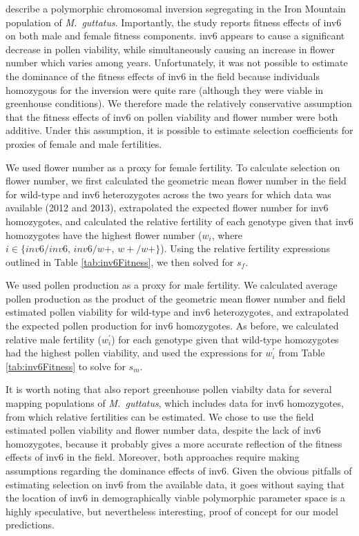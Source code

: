 \documentclass[11pt]{article}
\begin{document}
\citet{LeeKelly2015} describe a polymorphic chromosomal inversion segregating in the Iron Mountain population of {\itshape M.~guttatus}. Importantly, the study reports fitness effects of inv6 on both male and female fitness components. inv6 appears to cause a significant decrease in pollen viability, while simultaneously causing an increase in flower number which varies among years. Unfortunately, it was not possible to estimate the dominance of the fitness effects of inv6 in the field because individuals homozygous for the inversion were quite rare (although they were viable in greenhouse conditions). We therefore made the relatively conservative assumption that the fitness effects of inv6 on pollen viability and flower number were both additive. Under this assumption, it is possible to estimate selection coefficients for proxies of female and male fertilities. 

We used flower number as a proxy for female fertility. To calculate selection on flower number, we first calculated the geometric mean flower number in the field for wild-type and inv6 heterozygotes across the two years for which data was available (2012 and 2013), extrapolated the expected flower number for inv6 homozygotes, and calculated the relative fertility of each genotype given that inv6 homozygotes have the highest flower number ($w_i$, where $i \in \{inv6/inv6,\, inv6/w+,\, w+/w+\}$). Using the relative fertility expressions outlined in Table \ref{tab:inv6Fitness}, we then solved for $s_f$. 

We used pollen production as a proxy for male fertility. We calculated average pollen production as the product of the geometric mean flower number and field estimated pollen viability for wild-type and inv6 heterozygotes, and extrapolated the expected pollen production for inv6 homozygotes. As before, we calculated relative male fertility ($w^{\prime}_i$) for each genotype given that wild-type homozygotes had the highest pollen viability, and used the expressions for $w^{\prime}_{i}$ from Table \ref{tab:inv6Fitness} to solve for $s_m$.

It is worth noting that \citet{LeeKelly2015} also report greenhouse pollen viabilty data for several mapping populations of {\itshape M.~guttatus}, which includes data for inv6 homozygotes, from which relative fertilities can be estimated. We chose to use the field estimated pollen viability and flower number data, despite the lack of inv6 homozygotes, because it probably gives a more accurate reflection of the fitness effects of inv6 in the field. Moreover, both approaches require making assumptions regarding the dominance effects of inv6. Given the obvious pitfalls of estimating selection on inv6 from the available data, it goes without saying that the location of inv6 in demographically viable polymorphic parameter space is a highly speculative, but nevertheless interesting, proof of concept for our model predictions.
\end{document}
